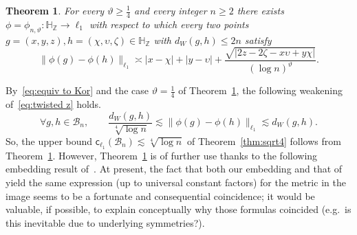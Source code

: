 \documentclass[11pt,reqno]{amsart}
\renewcommand{\H}{\mathbb{H}}
\newcommand{\Z}{\mathbb{Z}}
\newcommand{\cc}{{\mathsf{c}}}
\newcommand{\0}{\mathbf{0}}
\renewcommand{\1}{\mathbf 1}
\newcommand{\from}{\colon}
\renewcommand{\ge}{\geqslant}
\renewcommand{\le}{\leqslant}
\newtheorem{thm}{Theorem}[section]
\theoremstyle{remark}
\begin{document}
\begin{thm}\label{thm:twist the center} For every $\vartheta\ge  \frac14$ and every integer $n\ge 2$ there exists $\phi=\phi_{n,\vartheta}\from\H_\Z\to \ell_1$ with respect to which every two points $g=(x,y,z),h=(\chi,\upsilon,\zeta)\in \H_\Z$ with $d_W(g,h)\le 2n$ satisfy
\begin{equation}\label{eq:twisted z}
\|\phi(g)-\phi(h)\|_{\ell_1}\asymp |x-\chi|+|y-\upsilon|+\frac{\sqrt{|2z-2\zeta-x\upsilon+y\chi|}}{(\log n)^\vartheta}.
\end{equation}

\end{thm}
By~\eqref{eq:equiv to Kor} and the case $\vartheta=\frac14$ of Theorem~\ref{thm:twist the center}, the following weakening of~\eqref{eq:twisted z} holds.
$$
\forall g,h\in \mathcal{B}_n,\qquad \frac{d_W(g,h)}{\sqrt[4]{\log n}} \lesssim \|\phi(g)-\phi(h)\|_{\ell_1}\lesssim d_W(g,h).
$$
So, the upper bound $\cc_{\ell_1}(\mathcal{B}_n)\lesssim \sqrt[4]{\log n}$  of Theorem~\ref{thm:sqrt4} follows from Theorem~\ref{thm:twist the center}. However, Theorem~\ref{thm:twist the center} is of further use thanks to the following embedding result of~\cite{LN14}. At present, the fact that both  our embedding and that of~\cite{LN14} yield the same  expression (up to universal constant factors) for the metric in the image seems to be a fortunate and consequential coincidence; it would be valuable, if possible, to explain conceptually why those formulas  coincided   (e.g.~is this inevitable due to underlying symmetries?).
\end{document}
